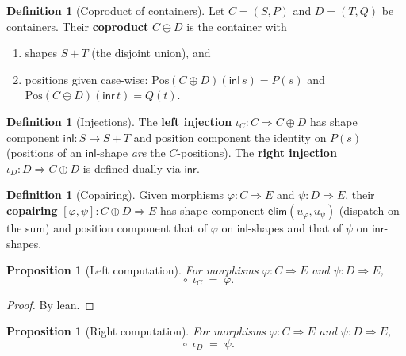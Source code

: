 \documentclass[11pt,a4paper]{article}
\theoremstyle{plain}
\newtheorem{proposition}[theorem]{Proposition}
\theoremstyle{definition}
\newtheorem{definition}[theorem]{Definition}
\newcommand{\Pos}{\mathrm{Pos}}
\begin{document}
\begin{definition}[Coproduct of containers]\label{def:coprod}
Let $C=(S,P)$ and $D=(T,Q)$ be containers. Their \textbf{coproduct}
$C\oplus D$ is the container with
\begin{enumerate}
  \item shapes $S+T$ (the disjoint union), and
  \item positions given case-wise:
        $\Pos(C\oplus D)(\mathsf{inl}\,s)=P(s)$ and
        $\Pos(C\oplus D)(\mathsf{inr}\,t)=Q(t)$.
\end{enumerate}
\end{definition}

\begin{definition}[Injections]\label{def:inl-inr}
The \textbf{left injection} $\iota_C:C\Rightarrow C\oplus D$ has shape
component $\mathsf{inl}:S\to S+T$ and position component the identity on
$P(s)$ (positions of an $\mathsf{inl}$-shape \emph{are} the $C$-positions).
The \textbf{right injection} $\iota_D:D\Rightarrow C\oplus D$ is defined
dually via $\mathsf{inr}$.
\end{definition}

\begin{definition}[Copairing]\label{def:desc}
Given morphisms $\varphi:C\Rightarrow E$ and $\psi:D\Rightarrow E$, their
\textbf{copairing} $[\varphi,\psi]:C\oplus D\Rightarrow E$ has shape
component $\mathsf{elim}(u_\varphi,u_\psi)$ (dispatch on the sum) and
position component that of $\varphi$ on $\mathsf{inl}$-shapes and that of
$\psi$ on $\mathsf{inr}$-shapes.
\end{definition}

\begin{proposition}[Left computation]\label{prop:inl-desc}
For morphisms $\varphi:C\Rightarrow E$ and $\psi:D\Rightarrow E$,
\begin{equation}
  [\varphi,\psi] \;\circ\; \iota_C \;=\; \varphi.
\end{equation}
\end{proposition}

\begin{proof}
By lean.
\end{proof}

\begin{proposition}[Right computation]\label{prop:inr-desc}
For morphisms $\varphi:C\Rightarrow E$ and $\psi:D\Rightarrow E$,
\begin{equation}
  [\varphi,\psi] \;\circ\; \iota_D \;=\; \psi.
\end{equation}
\end{proposition}
\end{document}
